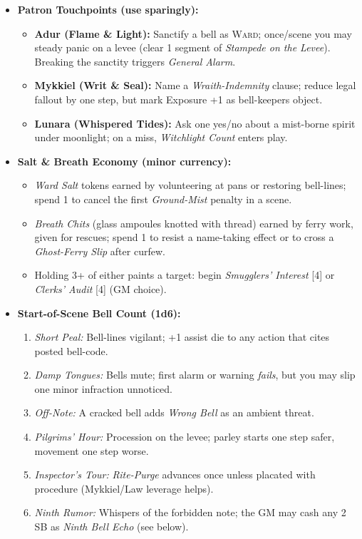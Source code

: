 \begin{itemize}
  \item \textbf{Patron Touchpoints (use sparingly):}
  \begin{itemize}
    \item \textbf{Adur (Flame \& Light):} Sanctify a bell as \textsc{Ward}; once/scene you may steady panic on a levee (clear 1 segment of \emph{Stampede on the Levee}). Breaking the sanctity triggers \emph{General Alarm}.
    \item \textbf{Mykkiel (Writ \& Seal):} Name a \emph{Wraith-Indemnity} clause; reduce legal fallout by one step, but mark Exposure +1 as bell-keepers object.
    \item \textbf{Lunara (Whispered Tides):} Ask one yes/no about a mist-borne spirit under moonlight; on a miss, \emph{Witchlight Count} enters play.
  \end{itemize}

  \item \textbf{Salt \& Breath Economy (minor currency):}
  \begin{itemize}
    \item \emph{Ward Salt} tokens earned by volunteering at pans or restoring bell-lines; spend 1 to cancel the first \emph{Ground-Mist} penalty in a scene.
    \item \emph{Breath Chits} (glass ampoules knotted with thread) earned by ferry work, given for rescues; spend 1 to resist a name-taking effect or to cross a \emph{Ghost-Ferry Slip} after curfew.
    \item Holding 3+ of either paints a target: begin \emph{Smugglers’ Interest} [4] or \emph{Clerks’ Audit} [4] (GM choice).
  \end{itemize}

  \item \textbf{Start-of-Scene Bell Count (1d6):}
  \begin{enumerate}
    \item \emph{Short Peal:} Bell-lines vigilant; +1 assist die to any action that cites posted bell-code.
    \item \emph{Damp Tongues:} Bells mute; first alarm or warning \emph{fails}, but you may slip one minor infraction unnoticed.
    \item \emph{Off-Note:} A cracked bell adds \emph{Wrong Bell} as an ambient threat.
    \item \emph{Pilgrims’ Hour:} Procession on the levee; parley starts one step safer, movement one step worse.
    \item \emph{Inspector’s Tour:} \emph{Rite-Purge} advances once unless placated with procedure (Mykkiel/Law leverage helps).
    \item \emph{Ninth Rumor:} Whispers of the forbidden note; the GM may cash any 2 SB as \emph{Ninth Bell Echo} (see below).
  \end{enumerate}


\end{itemize}
